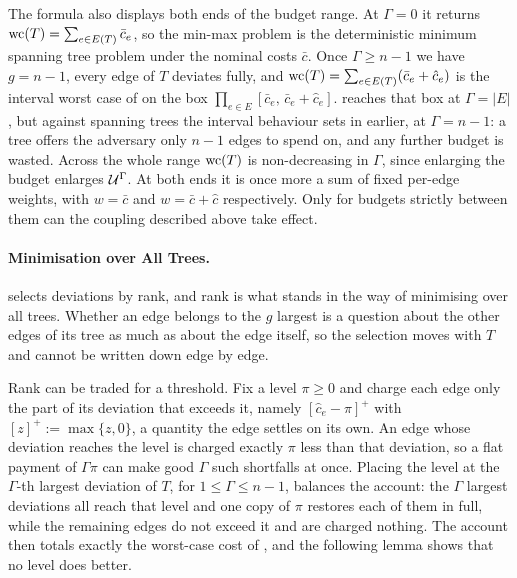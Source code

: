 The formula also displays both ends of the budget range.
At $\Gamma = 0$ it returns $\mathrm{wc}(T) = \sum_{e \in E(T)} \bar{c}_e$, so the min-max problem is the deterministic minimum spanning tree problem under the nominal costs $\bar{c}$.
Once $\Gamma \geq n-1$ we have $g = n-1$, every edge of $T$ deviates fully, and $\mathrm{wc}(T) = \sum_{e \in E(T)} (\bar{c}_e + \hat{c}_e)$ is the interval worst case of  on the box $\prod_{e \in E} [\bar{c}_e,\, \bar{c}_e + \hat{c}_e]$.
 reaches that box at $\Gamma = |E|$, but against spanning trees the interval behaviour sets in earlier, at $\Gamma = n-1$: a tree offers the adversary only $n-1$ edges to spend on, and any further budget is wasted.
Across the whole range $\mathrm{wc}(T)$ is non-decreasing in $\Gamma$, since enlarging the budget enlarges $\mathcal{U}^{\Gamma}$.
At both ends it is once more a sum of fixed per-edge weights, with $w = \bar{c}$ and $w = \bar{c} + \hat{c}$ respectively.
Only for budgets strictly between them can the coupling described above take effect.

\paragraph{Minimisation over All Trees.}

 selects deviations by rank, and rank is what stands in the way of minimising over all trees.
Whether an edge belongs to the $g$ largest is a question about the other edges of its tree as much as about the edge itself, so the selection moves with $T$ and cannot be written down edge by edge.

Rank can be traded for a threshold.
Fix a level $\pi \geq 0$ and charge each edge only the part of its deviation that exceeds it, namely $[\hat{c}_e - \pi]^{+}$ with $[z]^{+} := \max\{z, 0\}$, a quantity the edge settles on its own.
An edge whose deviation reaches the level is charged exactly $\pi$ less than that deviation, so a flat payment of $\Gamma\pi$ can make good $\Gamma$ such shortfalls at once.
Placing the level at the $\Gamma$-th largest deviation of $T$, for $1 \leq \Gamma \leq n-1$, balances the account: the $\Gamma$ largest deviations all reach that level and one copy of $\pi$ restores each of them in full, while the remaining edges do not exceed it and are charged nothing.
The account then totals exactly the worst-case cost of , and the following lemma shows that no level does better.

